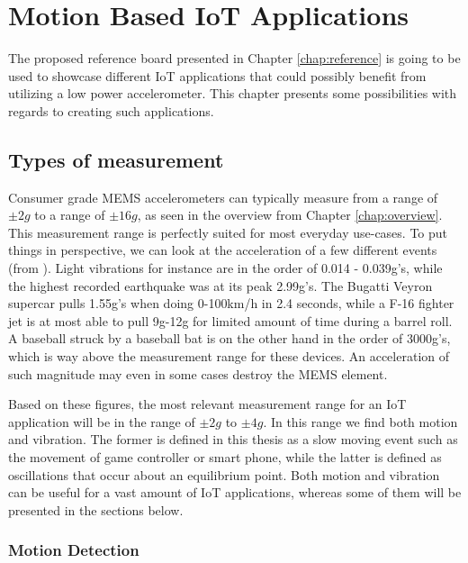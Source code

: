 \chapter{Motion Based IoT Applications}
\label{chap:applications}

The proposed reference board presented in Chapter \ref{chap:reference} is going to be used to showcase different IoT applications that could possibly benefit from utilizing a low power accelerometer. This chapter presents some possibilities with regards to creating such applications. 

\section{Types of measurement}

Consumer grade MEMS accelerometers can typically measure from a range of $\pm2g$ to a range of $\pm16g$, as seen in the overview from Chapter \ref{chap:overview}. This measurement range is perfectly suited for most everyday use-cases. To put things in perspective, we can look at the acceleration of a few different events (from \cite{g-force}). Light vibrations for instance are in the order of 0.014 - 0.039g's, while the highest recorded earthquake was at its peak 2.99g's. The Bugatti Veyron supercar pulls 1.55g's when doing 0-100km/h in 2.4 seconds, while a F-16 fighter jet is at most able to pull 9g-12g for limited amount of time during a barrel roll. A baseball struck by a baseball bat is on the other hand in the order of 3000g's, which is way above the measurement range for these devices. An acceleration of such magnitude may even in some cases destroy the MEMS element. 

Based on these figures, the most relevant measurement range for an IoT application will be in the range of $\pm2g$ to $\pm4g$. In this range we find both motion and vibration. The former is defined in this thesis as a slow moving event such as the movement of game controller or smart phone, while the latter is defined as oscillations that occur about an equilibrium point. Both motion and vibration can be useful for a vast amount of IoT applications, whereas some of them will be presented in the sections below. 

\subsection{Motion Detection}

